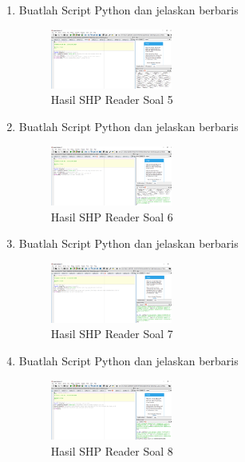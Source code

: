 \begin{enumerate}
    \item Buatlah Script Python dan jelaskan berbaris
    
    \hfill\break
    \begin{figure}[H]
		\includegraphics[width=4cm]{figures/1174031/3/soal5.PNG}
		\centering
		\caption{Hasil SHP Reader Soal 5}
    \end{figure}
  
    \item Buatlah Script Python dan jelaskan berbaris
    
    \hfill\break
    \begin{figure}[H]
		\includegraphics[width=4cm]{figures/1174031/3/soal6.PNG}
		\centering
		\caption{Hasil SHP Reader Soal 6}
    \end{figure}

    \item Buatlah Script Python dan jelaskan berbaris
    
    \hfill\break
    \begin{figure}[H]
		\includegraphics[width=4cm]{figures/1174031/3/soal7.PNG}
		\centering
		\caption{Hasil SHP Reader Soal 7}
    \end{figure}

    \item Buatlah Script Python dan jelaskan berbaris
    
    \hfill\break
    \begin{figure}[H]
		\includegraphics[width=4cm]{figures/1174031/3/soal8.PNG}
		\centering
		\caption{Hasil SHP Reader Soal 8}
    \end{figure}


\end{enumerate}
